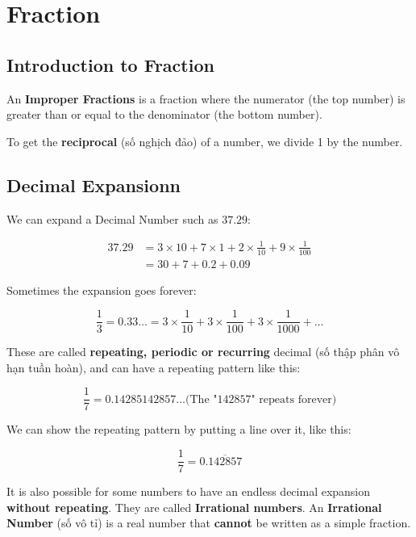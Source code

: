 
\chapter{Fraction}

\section{Introduction to Fraction}

An \textbf{Improper Fractions} is a fraction where the numerator (the top number) is greater than or equal to the denominator (the bottom number).

To get the \textbf{reciprocal} (số nghịch đảo) of a number, we divide 1 by the number.

\section{Decimal Expansionn}

We can expand a Decimal Number such as $37.29$:

\[
  \begin{aligned}
    37.29&=3 \times 10+7 \times 1+2 \times \frac{1}{10} + 9 \times \frac{1}{100}\\
    &=30+7+0.2+0.09
  \end{aligned}
\]

Sometimes the expansion goes forever:

\[\frac{1}{3}=0.33 \ldots=3 \times \frac{1}{10} + 3 \times \frac{1}{100} + 3 \times \frac{1}{1000} + \ldots\]

These are called \textbf{repeating, periodic or recurring} decimal (số thập phân vô hạn tuần hoàn), and can have a repeating pattern like this: 

\[\frac{1}{7}=0.14285142857\ldots \text{(The "142857" repeats forever)}\]

We can show the repeating pattern by putting a line over it, like this:

\[\frac{1}{7}=0.\overline{142857}\]

It is also possible for some numbers to have an endless decimal expansion \textbf{without repeating}. They are called \textbf{Irrational numbers}. An \textbf{Irrational Number} (số vô tỉ) is a real number that \textbf{cannot} be written as a simple fraction.

\vspace{10 mm}

